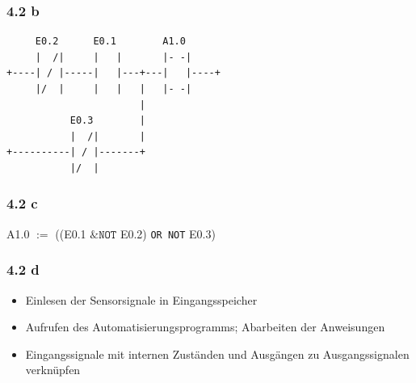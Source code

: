\documentclass[a4paper]{scrartcl}
\begin{document}
  \subsubsection*{4.2 b}
  \begin{lstlisting}
     E0.2      E0.1        A1.0
     |  /|     |   |       |- -|
+----| / |-----|   |---+---|   |----+
     |/  |     |   |   |   |- -|
                       |
           E0.3        |
           |  /|       |
+----------| / |-------+
           |/  |
  \end{lstlisting}
  \subsubsection*{4.2 c}
  A1.0 $:=$ ((E0.1 $\&\texttt{NOT}$ E0.2)  \texttt{OR NOT} E0.3)

  \subsubsection*{4.2 d}
  \begin{itemize}
	\item Einlesen der Sensorsignale in Eingangsspeicher
	\item Aufrufen des Automatisierungsprogramms; Abarbeiten der Anweisungen
	\item Eingangssignale mit internen Zuständen und Ausgängen zu Ausgangssignalen verknüpfen
  \end{itemize}
\end{document}

